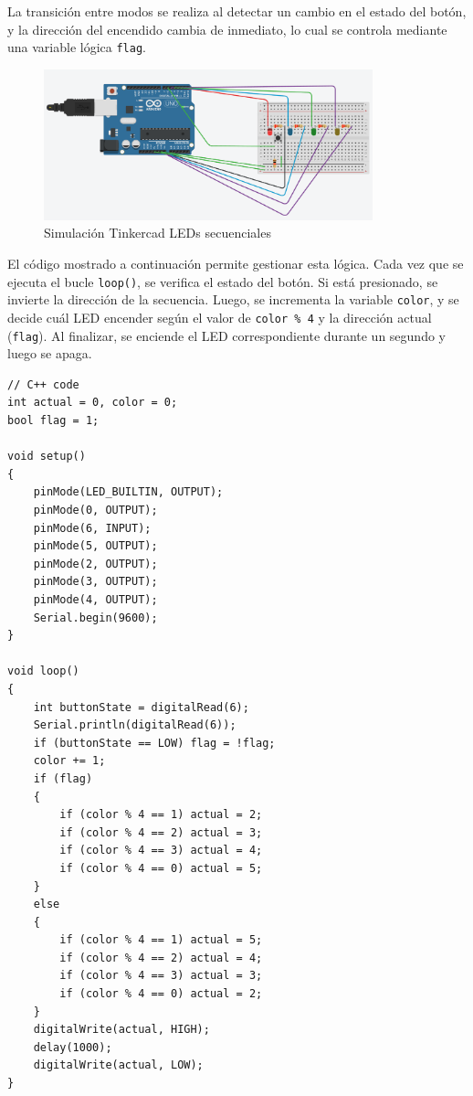 \documentclass{article}
\begin{document}
La transición entre modos se realiza al detectar un cambio en el estado del botón, y la dirección del encendido cambia de inmediato, lo cual se controla mediante una variable lógica \texttt{flag}.

\begin{figure}[H]
    \centering
    \includegraphics[width=0.85\textwidth]{./img/ckpt_6_0.png}
    \caption{Simulación Tinkercad LEDs secuenciales}
    \label{fig:leds_secuenciales}
\end{figure}

El código mostrado a continuación permite gestionar esta lógica. Cada vez que se ejecuta el bucle \texttt{loop()}, se verifica el estado del botón. Si est\'a presionado, se invierte la dirección de la secuencia. Luego, se incrementa la variable \texttt{color}, y se decide cu\'al LED encender según el valor de \texttt{color \% 4} y la dirección actual (\texttt{flag}). Al finalizar, se enciende el LED correspondiente durante un segundo y luego se apaga.


\begin{lstlisting}[style=cppstyle, caption={Código en C++ para el control de LEDs secuenciales.}, label={code:leds_secuenciales}]
// C++ code
int actual = 0, color = 0;
bool flag = 1;

void setup()
{
    pinMode(LED_BUILTIN, OUTPUT);
    pinMode(0, OUTPUT);
    pinMode(6, INPUT);
    pinMode(5, OUTPUT);
    pinMode(2, OUTPUT);
    pinMode(3, OUTPUT);
    pinMode(4, OUTPUT);
    Serial.begin(9600);
}

void loop()
{ 
    int buttonState = digitalRead(6);
    Serial.println(digitalRead(6));
    if (buttonState == LOW) flag = !flag;
    color += 1;
    if (flag)
    {
        if (color % 4 == 1) actual = 2;
        if (color % 4 == 2) actual = 3;
        if (color % 4 == 3) actual = 4;
        if (color % 4 == 0) actual = 5;
    } 
    else 
    {
        if (color % 4 == 1) actual = 5;
        if (color % 4 == 2) actual = 4;
        if (color % 4 == 3) actual = 3;
        if (color % 4 == 0) actual = 2;
    }
    digitalWrite(actual, HIGH);
    delay(1000);
    digitalWrite(actual, LOW);
}
\end{lstlisting}
\end{document}
